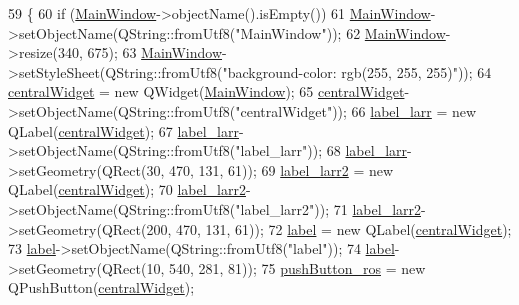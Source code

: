 \begin{DoxyCode}
59     \{
60         \textcolor{keywordflow}{if} (\hyperlink{class_main_window}{MainWindow}->objectName().isEmpty())
61             \hyperlink{class_main_window}{MainWindow}->setObjectName(QString::fromUtf8(\textcolor{stringliteral}{"MainWindow"}));
62         \hyperlink{class_main_window}{MainWindow}->resize(340, 675);
63         \hyperlink{class_main_window}{MainWindow}->setStyleSheet(QString::fromUtf8(\textcolor{stringliteral}{"background-color: rgb(255, 255, 255)"}));
64         \hyperlink{class_ui___main_window_a30075506c2116c3ed4ff25e07ae75f81}{centralWidget} = \textcolor{keyword}{new} QWidget(\hyperlink{class_main_window}{MainWindow});
65         \hyperlink{class_ui___main_window_a30075506c2116c3ed4ff25e07ae75f81}{centralWidget}->setObjectName(QString::fromUtf8(\textcolor{stringliteral}{"centralWidget"}));
66         \hyperlink{class_ui___main_window_a32587f1e879f5b685d375d2daa20f7a6}{label\_larr} = \textcolor{keyword}{new} QLabel(\hyperlink{class_ui___main_window_a30075506c2116c3ed4ff25e07ae75f81}{centralWidget});
67         \hyperlink{class_ui___main_window_a32587f1e879f5b685d375d2daa20f7a6}{label\_larr}->setObjectName(QString::fromUtf8(\textcolor{stringliteral}{"label\_larr"}));
68         \hyperlink{class_ui___main_window_a32587f1e879f5b685d375d2daa20f7a6}{label\_larr}->setGeometry(QRect(30, 470, 131, 61));
69         \hyperlink{class_ui___main_window_a06fc1a01ac3ba3d4d1f75a0e8ab06684}{label\_larr2} = \textcolor{keyword}{new} QLabel(\hyperlink{class_ui___main_window_a30075506c2116c3ed4ff25e07ae75f81}{centralWidget});
70         \hyperlink{class_ui___main_window_a06fc1a01ac3ba3d4d1f75a0e8ab06684}{label\_larr2}->setObjectName(QString::fromUtf8(\textcolor{stringliteral}{"label\_larr2"}));
71         \hyperlink{class_ui___main_window_a06fc1a01ac3ba3d4d1f75a0e8ab06684}{label\_larr2}->setGeometry(QRect(200, 470, 131, 61));
72         \hyperlink{class_ui___main_window_ad9c89133780f28e6efa2ec17ceb9cff5}{label} = \textcolor{keyword}{new} QLabel(\hyperlink{class_ui___main_window_a30075506c2116c3ed4ff25e07ae75f81}{centralWidget});
73         \hyperlink{class_ui___main_window_ad9c89133780f28e6efa2ec17ceb9cff5}{label}->setObjectName(QString::fromUtf8(\textcolor{stringliteral}{"label"}));
74         \hyperlink{class_ui___main_window_ad9c89133780f28e6efa2ec17ceb9cff5}{label}->setGeometry(QRect(10, 540, 281, 81));
75         \hyperlink{class_ui___main_window_a2667c2b4f9c61bf9895b73d07d4b5172}{pushButton\_ros} = \textcolor{keyword}{new} QPushButton(\hyperlink{class_ui___main_window_a30075506c2116c3ed4ff25e07ae75f81}{centralWidget});

\end{DoxyCode}

